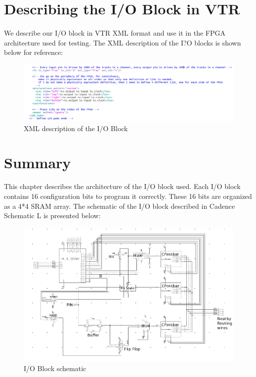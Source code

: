 \section{Describing the I/O Block in VTR}
\paragraph{}
We describe our I/O block in VTR XML format and use it in the FPGA architecture used for testing. The XML description of the I?O blocks is shown below for reference:

\begin{figure}[H]
\centering
\includegraphics[width=\textwidth]{ioblockvtrdescription.png}
\caption{XML description of the I/O Block}
\label{fig:Figure}
\end{figure}


\section{Summary}
\paragraph{}
This chapter describes the architecture of the I/O block used. Each I/O block contains 16 configuration bits to program it correctly. These 16 bits are organized as a 4*4 SRAM array. The schematic of the I/O block described in Cadence Schematic L is presented below:

\begin{figure}[H]
\centering
\includegraphics[width=\textwidth]{ioblock.png}
\caption{I/O Block schematic}
\label{fig:Figure}
\end{figure}


